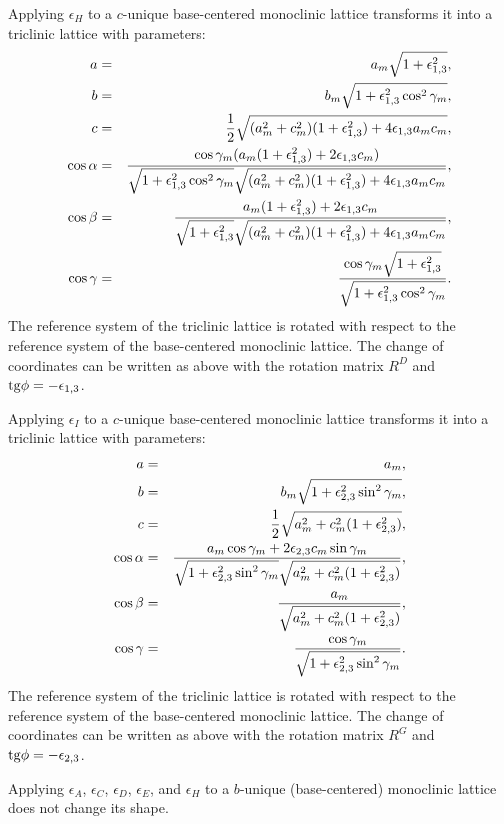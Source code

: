 \documentclass[12pt,a4paper,twoside]{report}
\begin{document}
Applying $\epsilon_H$ to a $c$-unique base-centered monoclinic lattice 
transforms it into a triclinic lattice with parameters:
\begin{eqnarray}
a&=&a_m \sqrt{1+\epsilon_{1,3}^2}, \\
b&=&b_m \sqrt{1+\epsilon_{1,3}^2 \cos^2\gamma_m}, \\
c&=&{1\over 2} \sqrt{(a_m^2+c_m^2)(1+\epsilon_{1,3}^2)+4\epsilon_{1,3}a_mc_m},\\
\cos\alpha &=& {\cos\gamma_m (a_m (1+\epsilon_{1,3}^2)+2\epsilon_{1,3}c_m) 
\over 
\sqrt{1+\epsilon_{1,3}^2 \cos^2\gamma_m} \sqrt{(a_m^2+c_m^2)(1+\epsilon_{1,3}^2)+4\epsilon_{1,3}a_mc_m}}, \\
\cos\beta &=& {a_m (1+\epsilon_{1,3}^2)+2\epsilon_{1,3}c_m 
\over 
\sqrt{1+\epsilon_{1,3}^2} \sqrt{(a_m^2+c_m^2)(1+\epsilon_{1,3}^2)+4\epsilon_{1,3}a_mc_m}}, \\
\cos\gamma &=& {\cos\gamma_m \sqrt{1+\epsilon_{1,3}^2} \over
\sqrt{1+\epsilon_{1,3}^2 \cos^2\gamma_m}}.
\end{eqnarray}
The reference system of the triclinic lattice is rotated 
with respect to the reference system of the base-centered
monoclinic lattice. 
The change of coordinates can be written as above with the rotation matrix 
$R^D$ and ${\rm tg}\phi=-\epsilon_{1,3}$.

Applying $\epsilon_I$ to a $c$-unique base-centered monoclinic lattice 
transforms it into a triclinic lattice with parameters:
\begin{eqnarray}
a&=&a_m, \\
b&=&b_m \sqrt{1+\epsilon_{2,3}^2 \sin^2\gamma_m}, \\
c&=&{1\over 2} \sqrt{a_m^2+c_m^2(1+\epsilon_{2,3}^2)},\\
\cos\alpha &=& {a_m\cos\gamma_m +2\epsilon_{2,3}c_m \sin \gamma_m 
\over 
\sqrt{1+\epsilon_{2,3}^2 \sin^2\gamma_m} 
\sqrt{a_m^2+c_m^2(1+\epsilon_{2,3}^2)}}, \\
\cos\beta &=& {a_m  
\over 
\sqrt{a_m^2+c_m^2(1+\epsilon_{2,3}^2)}}, \\
\cos\gamma &=& {\cos\gamma_m \over
\sqrt{1+\epsilon_{2,3}^2 \sin^2\gamma_m}}.
\end{eqnarray}
The reference system of the triclinic lattice is rotated 
with respect to the reference system of the base-centered
monoclinic lattice. 
The change of coordinates can be written as above with the rotation matrix 
$R^G$ and ${\rm tg}\phi=-\epsilon_{2,3}$.

Applying $\epsilon_A$, $\epsilon_C$, $\epsilon_D$, $\epsilon_E$, and
$\epsilon_H$ to a $b$-unique (base-centered) monoclinic lattice
does not change its shape.
\end{document}
